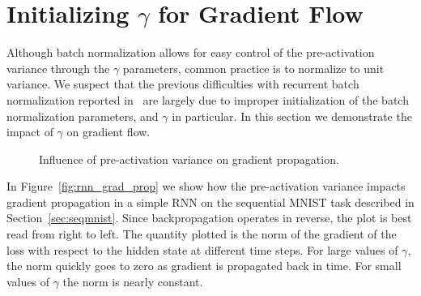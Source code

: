 \documentclass{article} %
\begin{document}
\section{Initializing $\gamma$ for Gradient Flow}
\label{sec:activation-variance}

Although batch normalization allows for easy control of the pre-activation variance through the $\gamma$ parameters,
common practice is to normalize to unit variance.
We suspect that the previous difficulties with recurrent batch normalization reported in~\citet{cesar,baidu}
are largely due to improper initialization of the batch normalization parameters, and $\gamma$ in particular.
In this section we demonstrate the impact of $\gamma$ on gradient flow.


\begin{figure}[!ht]
  \center%
  \hspace{2mm}%
  \caption{
Influence of pre-activation variance on gradient propagation.
}
  \label{fig:variance}
\end{figure}

In Figure~\ref{fig:rnn_grad_prop} we show how the pre-activation variance impacts gradient propagation in a simple RNN on the sequential MNIST task described in Section~\ref{sec:seqmnist}.
Since backpropagation operates in reverse, the plot is best read from right to left.
The quantity plotted is the norm of the gradient of the loss with respect to the hidden state at different time steps.
For large values of $\gamma$, the norm quickly goes to zero as gradient is propagated back in time.
For small values of $\gamma$ the norm is nearly constant.
\end{document}
